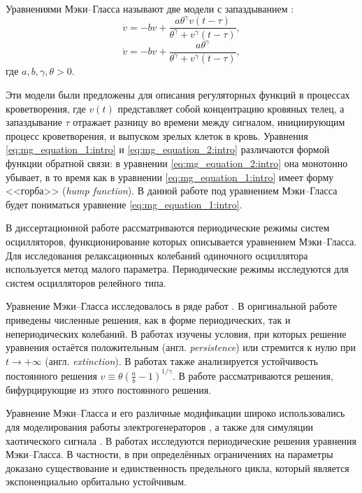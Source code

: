 

{\actuality} Уравнениями Мэки--Гласса называют две модели с запаздыванием \cite{Mackey1977, Glass1988}:
\begin{equation}
	\label{eq:mg_equation_1:intro}
	\dot{v}=-b v+\frac{a \theta^{\gamma} v(t-\tau)}{\theta^{\gamma}+v^{\gamma}(t-\tau)},
\end{equation}
\begin{equation}
	\label{eq:mg_equation_2:intro}
	\dot{v}=-b v+\frac{a \theta^{\gamma}}{\theta^{\gamma}+v^{\gamma}(t-\tau)},
\end{equation}
где $a, b, \gamma, \theta > 0$.

Эти модели были предложены для описания регуляторных функций в процессах кроветворения, где $v(t)$ представляет собой концентрацию кровяных телец, а запаздывание $\tau$ отражает разницу во времени между сигналом, инициирующим процесс кроветворения, и выпуском зрелых клеток в кровь. Уравнения \eqref{eq:mg_equation_1:intro} и \eqref{eq:mg_equation_2:intro} различаются формой функции обратной связи: в уравнении \eqref{eq:mg_equation_2:intro} она монотонно убывает, в то время как в уравнении \eqref{eq:mg_equation_1:intro} имеет форму <<горба>> (\emph{hump function}). В данной работе под уравнением Мэки--Гласса будет пониматься уравнение \eqref{eq:mg_equation_1:intro}.

В диссертационной работе рассматриваются периодические режимы систем осцилляторов, функционирование которых описывается уравнением Мэки--Гласса. Для исследования релаксационных колебаний одиночного осциллятора используется метод малого параметра. Периодические режимы исследуются для систем осцилляторов релейного типа.

Уравнение Мэки--Гласса исследовалось в ряде работ \cite{Junges2012, Berezansky2006, Su2011, Liz2002, Wu2007, Kubyshkin2016}. В оригинальной работе \cite{Mackey1977} приведены численные решения, как в форме периодических, так и непериодических колебаний. В работах \cite{Berezansky2006, Liz2002} изучены условия, при которых решение уравнения остаётся положительным (англ. \emph{persistence}) или стремится к нулю при $t \to +\infty$ (англ. \emph{extinction}). В работах \cite{Berezansky2006, Kubyshkin2016} также анализируется устойчивость постоянного решения $v \equiv \theta \left(\frac{a}{b} - 1\right)^{1/\gamma}$. В работе \cite{Kubyshkin2016} рассматриваются решения, бифурцирующие из этого постоянного решения.

Уравнение Мэки--Гласса и его различные модификации широко использовались для моделирования работы электрогенераторов \cite{Tateno2012, Namajunas1995, Glyzin2018, Glyzin2018a}, а также для симуляции хаотического сигнала \cite{Grassberger1983, Amil2015, Amil2015a, Shahverdiev2006}. В работах \cite{Bartha2021, Krisztin2020} исследуются периодические решения уравнения Мэки--Гласса. В частности, в \cite{Bartha2021} при определённых ограничениях на параметры доказано существование и единственность предельного цикла, который является экспоненциально орбитально устойчивым.

